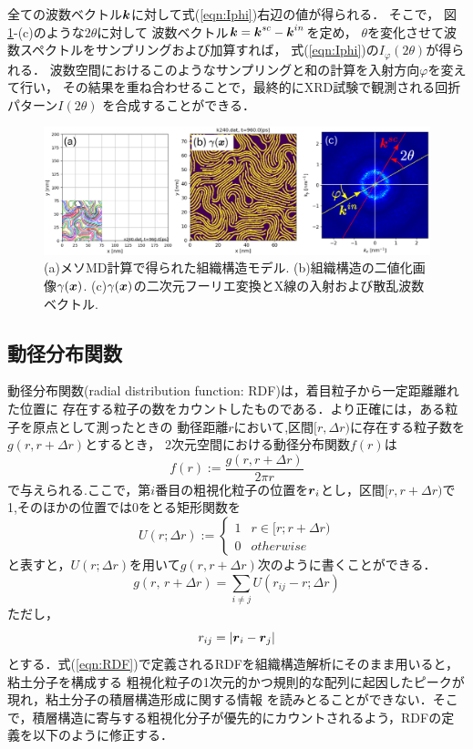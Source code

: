 全ての波数ベクトル$\mbox{\boldmath $k$}$に対して式(\ref{eqn:Iphi})右辺の値が得られる．
そこで，
図\ref{fig:fig5}-(c)のような$2\theta$に対して
波数ベクトル$\mbox{\boldmath $k$}=\mbox{\boldmath $k$}^{sc}-\mbox{\boldmath $k$}^{in}$を定め，
$\theta$を変化させて波数スペクトルをサンプリングおよび加算すれば，
式(\ref{eqn:Iphi})の$I_\varphi(2\theta)$が得られる．
波数空間におけるこのようなサンプリングと和の計算を入射方向$\varphi$を変えて行い，
その結果を重ね合わせることで，最終的にXRD試験で観測される回折パターン$I(2\theta)$
を合成することができる．
\begin{figure}[h]
	\begin{center}
	\includegraphics[width=1.0\linewidth]{Figs/fig5.eps} 
	\end{center}
	\caption{
		(a)メソMD計算で得られた組織構造モデル.
		(b)組織構造の二値化画像$\gamma(\mbox{\boldmath $x$})$. 
		(c)$\gamma(\mbox{\boldmath $x$})$の二次元フーリエ変換とX線の入射および散乱波数ベクトル.
	} 
	\label{fig:fig5}
\end{figure}
\subsection{動径分布関数}
動径分布関数(radial distribution function: RDF)は，着目粒子から一定距離離れた位置に
存在する粒子の数をカウントしたものである．より正確には，ある粒子を原点として測ったときの
動径距離$r$において,区間$[r,\Delta r)$に存在する粒子数を$g(r,r+\Delta r)$とするとき，
2次元空間における動径分布関数$f(r)$は
\begin{equation}
	f(r):=\frac{g(r,r+\Delta r)}{2\pi r}
	\label{eqn:RDF}
\end{equation}
で与えられる.ここで，第$i$番目の粗視化粒子の位置を$\mbox{\boldmath $r$}_i$とし，区間$[r,r+\Delta r)$で
1,そのほかの位置では0をとる矩形関数を
\begin{equation}
	U(r;\Delta r):=\left\{
		\begin{array}{cc}
			1 &  r \in [r;r+\Delta r)\\
			0 &  otherwise
		\end{array}
	\right.
	\label{eqn:}
\end{equation}
と表すと，$U(r;\Delta r)$を用いて$g(r,r+\Delta r)$次のように書くことができる．
\begin{equation}
	g(r,\,r+\Delta r)=\sum_{i\neq j} U(r_{ij}-r;\Delta r)
	\label{eqn:gr}
\end{equation}
ただし，
\begin{equation}
	r_{ij}=\left|\mbox{\boldmath $r$}_i-\mbox{\boldmath $r$}_j\right|
	\label{eqn:rij}
\end{equation}
とする．式(\ref{eqn:RDF})で定義されるRDFを組織構造解析にそのまま用いると，粘土分子を構成する
粗視化粒子の1次元的かつ規則的な配列に起因したピークが現れ，粘土分子の積層構造形成に関する情報
を読みとることができない．そこで，積層構造に寄与する粗視化分子が優先的にカウントされるよう，RDFの定義を以下のように修正する．

